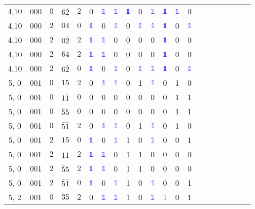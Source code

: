 \begin{longtable*}{c| cccccccccccccccccccc }
4,10& 000& $0$& $6\bar{2}$& $2$& 0& \textcolor{blue}{$\mathds{1}$}& \textcolor{blue}{$\mathds{1}$}& \textcolor{blue}{$\mathds{1}$}& 0& \textcolor{blue}{$\mathds{1}$}& \textcolor{blue}{$\mathds{1}$}& \textcolor{blue}{$\mathds{1}$}& 0\\
4,10& 000& $2$& $04$& $0$& \textcolor{blue}{$\mathds{1}$}& 0& \textcolor{blue}{$\mathds{1}$}& 0& \textcolor{blue}{$\mathds{1}$}& \textcolor{blue}{$\mathds{1}$}& \textcolor{blue}{$\mathds{1}$}& 0& \textcolor{blue}{$\mathds{1}$}\\
4,10& 000& $2$& $0\bar{2}$& $2$& \textcolor{blue}{$\mathds{1}$}& \textcolor{blue}{$\mathds{1}$}& 0& 0& 0& 0& \textcolor{blue}{$\mathds{1}$}& 0& 0\\
4,10& 000& $2$& $64$& $2$& \textcolor{blue}{$\mathds{1}$}& \textcolor{blue}{$\mathds{1}$}& 0& 0& 0& 0& \textcolor{blue}{$\mathds{1}$}& 0& 0\\
4,10& 000& $2$& $6\bar{2}$& $0$& \textcolor{blue}{$\mathds{1}$}& 0& \textcolor{blue}{$\mathds{1}$}& 0& \textcolor{blue}{$\mathds{1}$}& \textcolor{blue}{$\mathds{1}$}& \textcolor{blue}{$\mathds{1}$}& 0& \textcolor{blue}{$\mathds{1}$}\\
5, 0& 001& $0$& $15$& $2$& 0& \textcolor{blue}{$\mathds{1}$}& \textcolor{blue}{$\mathds{1}$}& 0& 1& \textcolor{blue}{$\mathds{1}$}& 0& 1& 0\\
5, 0& 001& $0$& $1\bar{1}$& $0$& 0& 0& 0& 0& 0& 0& 0& 1& 1\\
5, 0& 001& $0$& $\bar{5}5$& $0$& 0& 0& 0& 0& 0& 0& 0& 1& 1\\
5, 0& 001& $0$& $\bar{5}\bar{1}$& $2$& 0& \textcolor{blue}{$\mathds{1}$}& \textcolor{blue}{$\mathds{1}$}& 0& 1& \textcolor{blue}{$\mathds{1}$}& 0& 1& 0\\
5, 0& 001& $2$& $15$& $0$& \textcolor{blue}{$\mathds{1}$}& 0& \textcolor{blue}{$\mathds{1}$}& 1& 0& \textcolor{blue}{$\mathds{1}$}& 0& 0& 1\\
5, 0& 001& $2$& $1\bar{1}$& $2$& \textcolor{blue}{$\mathds{1}$}& \textcolor{blue}{$\mathds{1}$}& 0& 1& 1& 0& 0& 0& 0\\
5, 0& 001& $2$& $\bar{5}5$& $2$& \textcolor{blue}{$\mathds{1}$}& \textcolor{blue}{$\mathds{1}$}& 0& 1& 1& 0& 0& 0& 0\\
5, 0& 001& $2$& $\bar{5}\bar{1}$& $0$& \textcolor{blue}{$\mathds{1}$}& 0& \textcolor{blue}{$\mathds{1}$}& 1& 0& \textcolor{blue}{$\mathds{1}$}& 0& 0& 1\\
5, 2& 001& $0$& $35$& $2$& 0& \textcolor{blue}{$\mathds{1}$}& \textcolor{blue}{$\mathds{1}$}& 1& 0& \textcolor{blue}{$\mathds{1}$}& 1& 0& 1\\

\end{longtable*}
